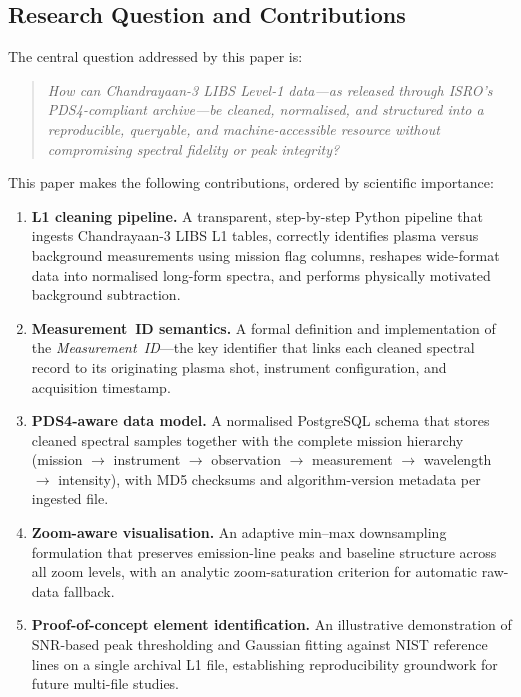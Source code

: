 \documentclass[a4paper,twocolumn,10pt]{article}
\begin{document}
\subsection{Research Question and Contributions}

The central question addressed by this paper is:

\begin{quote}
\emph{How can Chandrayaan-3 LIBS Level-1 data---as released through
ISRO's PDS4-compliant archive---be cleaned, normalised, and structured
into a reproducible, queryable, and machine-accessible resource
without compromising spectral fidelity or peak integrity?}
\end{quote}

This paper makes the following contributions, ordered by scientific
importance:

\begin{enumerate}[label=\textbf{(C\arabic*)},leftmargin=*,itemsep=3pt]
  \item \textbf{L1 cleaning pipeline.}  A transparent,
    step-by-step Python pipeline that ingests Chandrayaan-3 LIBS L1
    tables, correctly identifies plasma versus background measurements
    using mission flag columns, reshapes wide-format data into
    normalised long-form spectra, and performs physically motivated
    background subtraction.

  \item \textbf{Measurement~ID semantics.}  A formal definition and
    implementation of the \emph{Measurement~ID}---the key identifier
    that links each cleaned spectral record to its originating plasma
    shot, instrument configuration, and acquisition timestamp.

  \item \textbf{PDS4-aware data model.}  A normalised PostgreSQL
    schema that stores cleaned spectral samples together with the
    complete mission hierarchy (mission $\rightarrow$ instrument
    $\rightarrow$ observation $\rightarrow$ measurement $\rightarrow$
    wavelength $\rightarrow$ intensity), with MD5 checksums and
    algorithm-version metadata per ingested file.

  \item \textbf{Zoom-aware visualisation.}  An adaptive min--max
    downsampling formulation that preserves emission-line peaks
    and baseline structure across all zoom levels, with an analytic
    zoom-saturation criterion for automatic raw-data fallback.

  \item \textbf{Proof-of-concept element identification.}  An illustrative
    demonstration of SNR-based peak thresholding and Gaussian fitting
    against NIST reference lines on a single archival L1 file, establishing
    reproducibility groundwork for future multi-file studies.
\end{enumerate}
\end{document}
